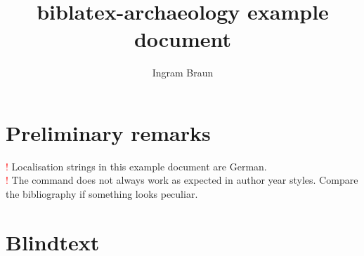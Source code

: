 \documentclass[a4paper,12pt]{scrartcl}
\title{biblatex-archaeology example document}
\subtitle{\explhead}
\author{Ingram Braun}
\newcommand{\exmplwarn}[1]{\textcolor{red}{\Huge!} #1\\}
\begin{document}

\maketitle
\tableofcontents

\section{Preliminary remarks}

\exmplwarn{Localisation strings in this example document are German.}
    {\exmplwarn{The \detokenize{\fullcite} command does not always work as expected in author year styles. Compare the bibliography if something looks peculiar.}%
    }
    {}

\section{Blindtext}
\end{document}
